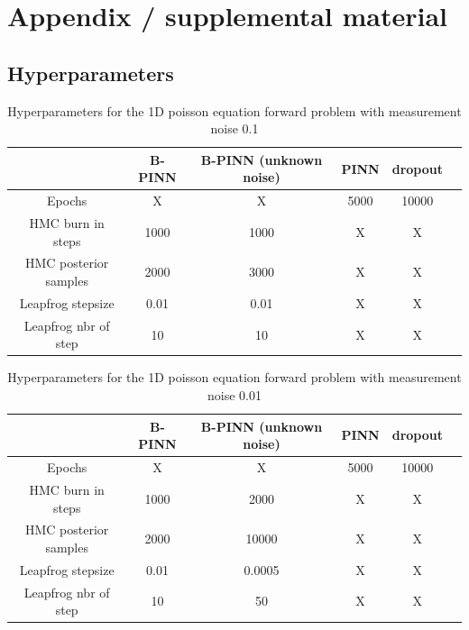 \documentclass{article}
\begin{document}




\appendix

\section{Appendix / supplemental material}
\subsection{Hyperparameters}



\begin{table}[H]
\centering
\begin{tabular}{|c|c|c|c|c|c|}
\hline
 & B-PINN & B-PINN (unknown noise)  & PINN & dropout  \\
\hline
Epochs  & \large{X} & \large{X} & 5000 & 10000\\
\hline
HMC burn in steps & 1000 & 1000 & \large{X} & \large{X} \\
\hline
HMC posterior samples &  2000 & 3000 & \large{X}  & \large{X} \\
\hline
Leapfrog stepsize & 0.01 & 0.01 & \large{X}  & \large{X} \\
\hline
Leapfrog nbr of step & 10 & 10 & \large{X}  & \large{X} \\
\hline
\end{tabular}
\caption{Hyperparameters for the 1D poisson equation forward problem with measurement noise 0.1}
\label{tab:hp}
\end{table}


\begin{table}[H]
\centering
\begin{tabular}{|c|c|c|c|c|c|}
\hline
 & B-PINN & B-PINN (unknown noise)  & PINN & dropout  \\
\hline
Epochs  & \large{X} & \large{X} & 5000 & 10000 \\
\hline
HMC burn in steps & 1000 &  2000 & \large{X} & \large{X} \\
\hline
HMC posterior samples &  2000 &  10000& \large{X}  & \large{X} \\
\hline
Leapfrog stepsize & 0.01 & 0.0005   & \large{X}  & \large{X} \\
\hline
Leapfrog nbr of step & 10 & 50 & \large{X}  & \large{X} \\
\hline
\end{tabular}
\caption{Hyperparameters for the 1D poisson equation forward problem with measurement noise 0.01}
\label{tab:hp2}
\end{table}
\end{document}
